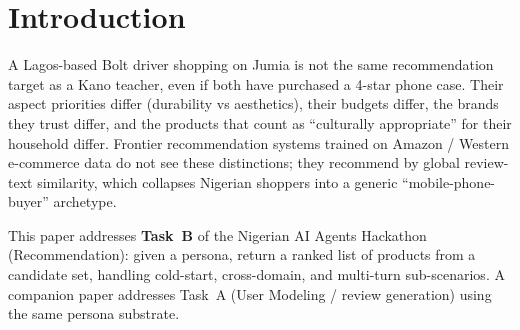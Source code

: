 \documentclass[sigconf,nonacm,balance]{acmart}
\begin{document}
\section{Introduction}

A Lagos-based Bolt driver shopping on Jumia is not the same recommendation
target as a Kano teacher, even if both have purchased a 4-star phone case.
Their aspect priorities differ (durability vs aesthetics), their budgets
differ, the brands they trust differ, and the products that count as
``culturally appropriate'' for their household differ. Frontier
recommendation systems trained on Amazon / Western e-commerce data do
not see these distinctions; they recommend by global review-text
similarity, which collapses Nigerian shoppers into a generic
``mobile-phone-buyer'' archetype.

This paper addresses \textbf{Task~B} of the Nigerian AI Agents Hackathon
(Recommendation): given a persona, return a ranked list of products from
a candidate set, handling cold-start, cross-domain, and multi-turn
sub-scenarios. A companion paper addresses Task~A (User Modeling /
review generation) using the same persona substrate.
\end{document}
